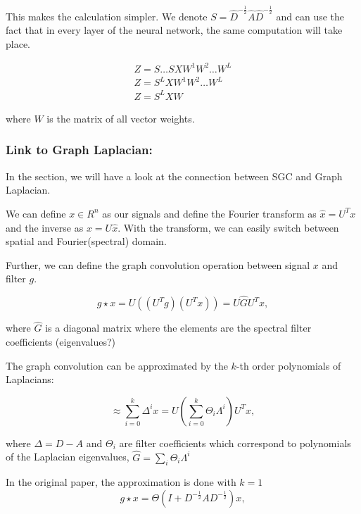 This makes the calculation simpler. We denote $S = \hat{D}^{-\frac{1}{2}} \hat{A} \hat{D}^{-\frac{1}{2}} $
and can use the fact that in every layer of the neural network, the same computation will take place.

\begin{equation}
    \begin{aligned}
        Z = S \dots S X W^1 W^2 \dots W^L \\
        Z = S^L X W^1 W^2 \dots W^L \\
        Z = S^L X W    
    \end{aligned}
\end{equation}

where $W$ is the matrix of all vector weights.



\subsubsection{Link to Graph Laplacian:}

In the section, we will have a look at the connection between SGC and Graph Laplacian.

We can define $x \in R^n$ as our signals and define the Fourier transform as $\hat{x} = U^T x$
and the inverse as $x = U\hat{x}$. 
With the transform, we can easily switch between spatial and Fourier(spectral) domain.

Further, we can define the graph convolution operation between signal $x$ and filter $g$.

\begin{equation}
    g \star x = U((U^T g) (U^T x)) = U \hat{G} U^T x,
\end{equation}

where $\hat{G}$ is a diagonal matrix where the elements are the 
spectral filter coefficients (eigenvalues?)

The graph convolution can be approximated by the $k$-th order polynomials of Laplacians:

\begin{equation}
    \approx \sum_{i=0}^{k} \Delta^i x = U \left ( \sum_{i=0}^{k}  \Theta_i \Lambda^i \right ) U^T x,
\end{equation}

where $\Delta = D - A$ and $\Theta_i$ are 
filter coefficients which correspond to polynomials of the Laplacian eigenvalues,
 $\hat{G} = \sum_i \Theta_i \Lambda^i$


 In the original \cite{GCN} paper, the approximation is done with $k = 1$ 
 \begin{equation}
     g \star x = \Theta (I + D^{-\frac{1}{2}} A D^{-\frac{1}{2}} )x,
 \end{equation}

